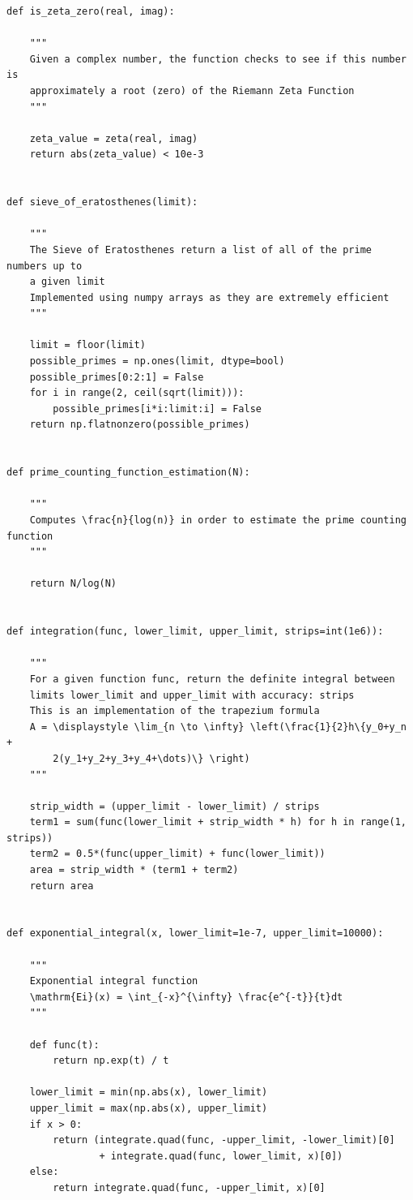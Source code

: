 \documentclass{article}
\begin{document}
\begin{lstlisting}
def is_zeta_zero(real, imag):

    """
    Given a complex number, the function checks to see if this number is
    approximately a root (zero) of the Riemann Zeta Function
    """

    zeta_value = zeta(real, imag)
    return abs(zeta_value) < 10e-3


def sieve_of_eratosthenes(limit):

    """
    The Sieve of Eratosthenes return a list of all of the prime numbers up to
    a given limit
    Implemented using numpy arrays as they are extremely efficient
    """

    limit = floor(limit)
    possible_primes = np.ones(limit, dtype=bool)
    possible_primes[0:2:1] = False
    for i in range(2, ceil(sqrt(limit))):
        possible_primes[i*i:limit:i] = False
    return np.flatnonzero(possible_primes)


def prime_counting_function_estimation(N):

    """
    Computes \frac{n}{log(n)} in order to estimate the prime counting function
    """

    return N/log(N)


def integration(func, lower_limit, upper_limit, strips=int(1e6)):

    """
    For a given function func, return the definite integral between
    limits lower_limit and upper_limit with accuracy: strips
    This is an implementation of the trapezium formula
    A = \displaystyle \lim_{n \to \infty} \left(\frac{1}{2}h\{y_0+y_n +
        2(y_1+y_2+y_3+y_4+\dots)\} \right)
    """

    strip_width = (upper_limit - lower_limit) / strips
    term1 = sum(func(lower_limit + strip_width * h) for h in range(1, strips))
    term2 = 0.5*(func(upper_limit) + func(lower_limit))
    area = strip_width * (term1 + term2)
    return area


def exponential_integral(x, lower_limit=1e-7, upper_limit=10000):

    """
    Exponential integral function
    \mathrm{Ei}(x) = \int_{-x}^{\infty} \frac{e^{-t}}{t}dt
    """

    def func(t):
        return np.exp(t) / t

    lower_limit = min(np.abs(x), lower_limit)
    upper_limit = max(np.abs(x), upper_limit)
    if x > 0:
        return (integrate.quad(func, -upper_limit, -lower_limit)[0]
                + integrate.quad(func, lower_limit, x)[0])
    else:
        return integrate.quad(func, -upper_limit, x)[0]



\end{lstlisting}
\end{document}
